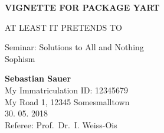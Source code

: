 \documentclass[11pt,ngerman,a4paper,oneside]{article}
\begin{document}


\begin{titlepage}

    \begin{center}
           \begin{figure}
			\centering
			
		\end{figure}

       \vspace*{1cm}

       \LARGE{ \textbf{   \uppercase{Vignette for package yart}   }}


       \large{   \uppercase{At least it pretends to}   }

        \vspace{2cm}

         Seminar: Solutions to All and Nothing \\ 
         \large{Sophism}  \\ 

        \vspace{1cm}

         \textbf{Sebastian Sauer}  \\ 
         My Immatriculation ID: 12345679 \\ 
         My Road 1, 12345 Somesmalltown  \\ 

         \vspace{1cm}
         30. 05. 2018 \\ 

                \vspace{.51cm}
         Referee: Prof.~Dr.~I. Weiss-Ois
         
         \vfill



     \end{center}
    \thispagestyle{empty}
\end{titlepage}

\newpage
\end{document}
